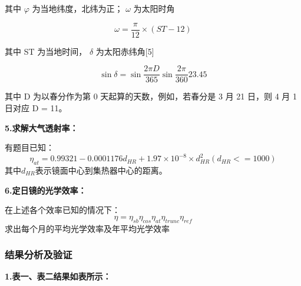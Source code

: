 \documentclass{数学建模}
\begin{document}
其中 $\varphi$ 为当地纬度，北纬为正； $\omega$ 为太阳时角

$$
\omega = \frac{\pi}{12} \times (ST - 12)
$$

其中 ST 为当地时间， $\delta$ 为太阳赤纬角[5]

$$
\sin \delta = \sin \frac{2 \pi D}{365} \sin \frac{2 \pi}{360} 23.45
$$

其中 D 为以春分作为第 0 天起算的天数，例如，若春分是 3 月 21 日，则 4 月 1 日对应 D = 11。



\textbf{5.求解大气透射率：}

有题目已知：
\begin{equation}
    \eta_{at} = 0.99321 - 0.0001176d_{HR} + 1.97\times 10^{-8}\times d_{HR}^2(d_{HR}< = 1000)
\end{equation}
其中$d_{HR}$表示镜面中心到集热器中心的距离。

\textbf{6.定日镜的光学效率：}

在上述各个效率已知的情况下：
\begin{equation}
    \eta = \eta_{sb}\eta_{cos}\eta_{at}\eta_{trunc}\eta_{ref}
\end{equation}
求出每个月的平均光学效率及年平均光学效率

\subsubsection{结果分析及验证}
\textbf{1.表一、表二结果如表所示：}
\end{document}
